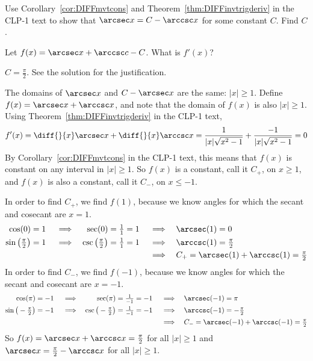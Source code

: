 \begin{question}
Use  Corollary~\ref*{cor:DIFFmvtcons} %
and Theorem~\ref*{thm:DIFFinvtrigderiv} %
in the CLP-1 text to show that $\arcsec x=C-\arccsc x$ for some constant $C$. Find $C$.
\end{question}
\begin{hint}
Let $f(x)=\arcsec x + \arccsc c -C$. %
What is $f'(x)$?
\end{hint}
\begin{answer}
$C=\frac{\pi}{2}$. See the solution for the justification.
\end{answer}
\begin{solution}
The domains of $\arcsec x$ and $C-\arcsec x$ are the same: $|x| \geq 1$.
Define $f(x)=\arcsec x + \arccsc x$, and note that the domain of $f(x)$ is also $|x| \geq 1$.
Using Theorem~\ref*{thm:DIFFinvtrigderiv} in the CLP-1 text,
\begin{equation*}
f'(x)=\diff{}{x}\arcsec x+\diff{}{x} \arccsc x
 = \dfrac{1}{|x|\sqrt{x^2-1}}+\dfrac{-1}{|x|\sqrt{x^2-1}}=0
\end{equation*}
By Corollary~\ref*{cor:DIFFmvtcons} in the CLP-1 text, this means that $f(x)$ 
is constant on any interval in $|x|\ge 1$. So $f(x)$ is a constant, call it $C_+$, on $x\ge 1$, and $f(x)$ is also a constant, call it $C_-$, on $x\le -1$.

In order to find $C_+$, we find $f(1)$, because we know angles for which the secant and cosecant are $x=1$.
\begin{alignat*}{7}
\cos(0)&=1                    &&\implies &\sec(0)&=\tfrac{1}{1}=1 
                              &&\implies &&\arcsec(1)=0
\\
\sin\big(\tfrac{\pi}{2}\big)&=1 
                &&\implies &\csc\big(\tfrac{\pi}{2}\big)&=\tfrac{1}{1}=1 
                &&\implies &&\arccsc(1)=\tfrac{\pi}{2}
\\
        &  && & &  && \implies &&C_+=\arcsec(1)+\arccsc(1)=\tfrac{\pi}{2}
\end{alignat*}
In order to find $C_-$, we find $f(-1)$, because we know angles for which the secant and cosecant are $x=-1$.
\begin{alignat*}{7}
\cos(\pi)&=-1                    &&\implies &\sec(\pi)&=\tfrac{1}{-1}=-1 
                              &&\implies &&\arcsec(-1)=\pi
\\
\sin\big(-\tfrac{\pi}{2}\big)&=-1 
                &&\implies &\csc\big(-\tfrac{\pi}{2}\big)&=\tfrac{1}{-1}=-1 
                &&\implies &&\arccsc(-1)=-\tfrac{\pi}{2}
\\
        &  && & &  && \implies &&C_-=\arcsec(-1)+\arccsc(-1)=\tfrac{\pi}{2}
\end{alignat*}
So $f(x)=\arcsec x + \arccsc x=\frac{\pi}{2}$ for all $|x|\ge 1$
and $\arcsec x = \frac{\pi}{2}- \arccsc x$ for all $|x|\ge 1$.
\end{solution}


